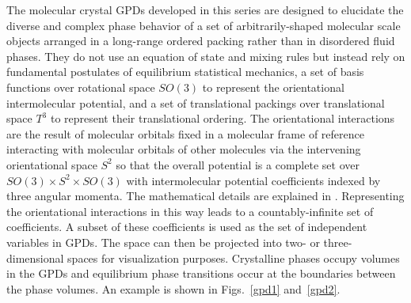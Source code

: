 \documentclass[preprint]{iucr}              %
\begin{document}
The molecular crystal GPDs developed in this series are designed to elucidate
the diverse and complex phase behavior of a set of arbitrarily-shaped molecular
scale objects arranged in a long-range ordered packing rather than in
disordered fluid phases.  They do not use an equation of state and mixing rules
but instead rely on fundamental postulates of equilibrium statistical
mechanics, a set of basis functions over rotational space $SO(3)$ to represent
the orientational intermolecular potential, and a set of translational packings
over translational space $T^3$ to represent their translational ordering.  The
orientational interactions are the result of molecular orbitals fixed in a
molecular frame of reference interacting with molecular orbitals of other
molecules via the intervening orientational space $S^2$ so that the overall
potential is a complete set over $SO(3) \times S^2 \times SO(3)$ with
intermolecular potential coefficients indexed by three angular momenta.  The
mathematical details are explained in \cite{Mettes04}.  Representing the
orientational interactions in this way leads to a countably-infinite set of
coefficients.  A subset of these coefficients is used as the set of independent
variables in GPDs.  The space can then be projected into two- or
three-dimensional spaces for visualization purposes.  Crystalline phases occupy
volumes in the GPDs and equilibrium phase transitions occur at the boundaries
between the phase volumes.  An example is shown in Figs.~\ref{gpd1}
and~\ref{gpd2}.
\end{document}
